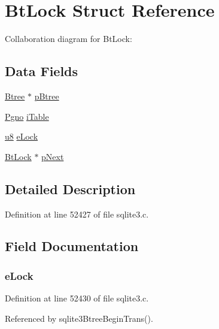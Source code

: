 \hypertarget{struct_bt_lock}{}\section{Bt\+Lock Struct Reference}
\label{struct_bt_lock}


Collaboration diagram for Bt\+Lock\+:
\subsection*{Data Fields}
\begin{DoxyCompactItemize}
\item 
\hyperlink{struct_btree}{Btree} $\ast$ \hyperlink{struct_bt_lock_a8bc098d3190d7b0458b0f00fc3e9841b}{p\+Btree}
\item 
\hyperlink{sqlite3_8c_aec0c653e8dd16e4639caf2f8ea54f55c}{Pgno} \hyperlink{struct_bt_lock_a3fcabb855c7cc0012054edd0e5b4f563}{i\+Table}
\item 
\hyperlink{sqlite3_8c_a74a0f6424ae628af25f23f0a35f6ead3}{u8} \hyperlink{struct_bt_lock_a94707eed51e15e9b3406656be1e3a39a}{e\+Lock}
\item 
\hyperlink{struct_bt_lock}{Bt\+Lock} $\ast$ \hyperlink{struct_bt_lock_afb07c44543b64b4979cb4d58c98e7cad}{p\+Next}
\end{DoxyCompactItemize}


\subsection{Detailed Description}


Definition at line 52427 of file sqlite3.\+c.



\subsection{Field Documentation}
\hypertarget{struct_bt_lock_a94707eed51e15e9b3406656be1e3a39a}{}
\subsubsection[{e\+Lock}]{ e\+Lock}\label{struct_bt_lock_a94707eed51e15e9b3406656be1e3a39a}


Definition at line 52430 of file sqlite3.\+c.



Referenced by sqlite3\+Btree\+Begin\+Trans().

